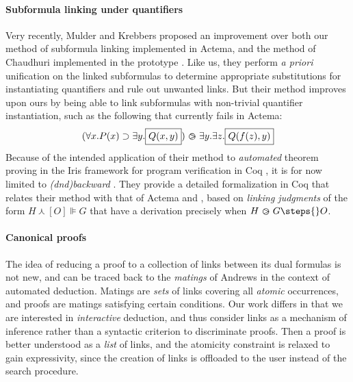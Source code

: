 \paragraph{Subformula linking under quantifiers}

Very recently, Mulder and Krebbers  proposed
an improvement over both our method of subformula linking implemented in Actema,
and the method of Chaudhuri implemented in the  prototype
. Like us, they perform \textit{a priori}
unification on the linked subformulas to determine appropriate substitutions for
instantiating quantifiers and rule out unwanted links. But their method improves
upon ours by being able to link subformulas with non-trivial quantifier
instantiation, such as the following  that currently fails in
Actema:
$$(\forall x. P(x) \supset \exists y. \fbox{$Q(x,y)$}) \operatorname{\,\varogreaterthan\,} \exists y. \exists z.
\fbox{$Q(f(z),y)$}$$ Because of the intended application of their method to
\emph{automated} theorem proving in the Iris framework for program verification
in Coq , it is for now limited to \emph{\kl(dnd){backward}}
. They provide a detailed formalization in Coq that relates their method
with that of Actema and , based on \emph{linking judgments} of the
form $H \curlywedge [O]\VDash G$ that have a derivation precisely when $H \back
G \steps{} O$.

\paragraph{Canonical proofs}

The idea of reducing a proof to a collection of links between its dual formulas
is not new, and can be traced back to the \emph{matings} of Andrews
 in the context of automated deduction. Matings are
\emph{sets} of links covering all \emph{atomic} occurrences, and proofs are
matings satisfying certain conditions. Our work differs in that we are
interested in \emph{interactive} deduction, and thus consider links as a
mechanism of inference rather than a syntactic criterion to discriminate proofs.
Then a proof is better understood as a \emph{list} of links, and the atomicity
constraint is relaxed to gain expressivity, since the creation of links is
offloaded to the user instead of the search procedure.

